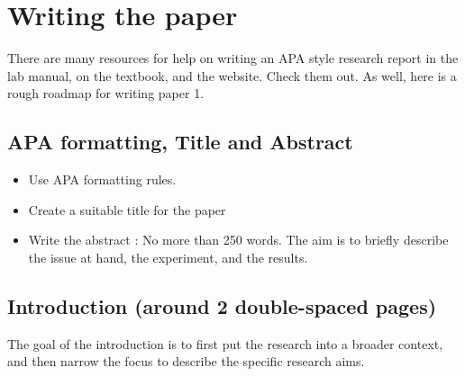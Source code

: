\section{Writing the paper}

There are many resources for help on writing an APA style research report in the lab manual, on the textbook, and the website. Check them out. As well, here is a rough roadmap for writing paper 1.

\subsection{APA formatting, Title and Abstract}

\begin{itemize}
\item Use APA formatting rules.

\item Create a suitable title for the paper

\item Write the abstract : No more than 250 words. The aim is to briefly describe the issue at hand, the experiment, and the results.
\end{itemize}

\subsection{Introduction (around 2 double-spaced pages)}

The goal of the introduction is to first put the research into a broader context, and then narrow the focus to describe the specific research aims.

